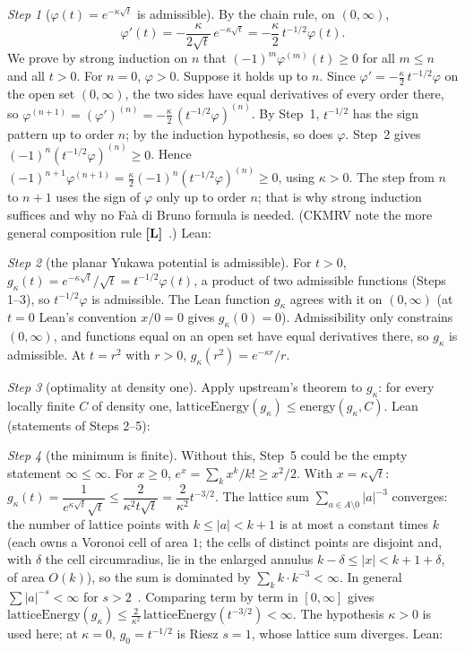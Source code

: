 \documentclass[11pt]{article}
\theoremstyle{remark}
\newtheorem{step}{Step}
\newcommand{\tier}[1]{\textbf{[#1]}}
\begin{document}
\begin{step}[$\varphi(t)=e^{-\kappa\sqrt t}$ is admissible]
By the chain rule, on $(0,\infty)$,
\[\varphi'(t)=-\frac{\kappa}{2\sqrt t}\,e^{-\kappa\sqrt t}=-\frac\kappa2\,t^{-1/2}\varphi(t).\]
We prove by strong induction on $n$ that $(-1)^m\varphi^{(m)}(t)\ge0$ for all $m\le n$ and all $t>0$. For $n=0$,
$\varphi>0$. Suppose it holds up to $n$. Since $\varphi'=-\tfrac\kappa2\,t^{-1/2}\varphi$ on the open set $(0,\infty)$,
the two sides have equal derivatives of every order there, so
$\varphi^{(n+1)}=(\varphi')^{(n)}=-\tfrac\kappa2\,(t^{-1/2}\varphi)^{(n)}$. By Step~1, $t^{-1/2}$ has the sign pattern
up to order $n$; by the induction hypothesis, so does $\varphi$. Step~2 gives $(-1)^n(t^{-1/2}\varphi)^{(n)}\ge0$.
Hence $(-1)^{n+1}\varphi^{(n+1)}=\tfrac\kappa2(-1)^n(t^{-1/2}\varphi)^{(n)}\ge0$, using $\kappa>0$. The step from $n$ to
$n+1$ uses the sign of $\varphi$ only up to order $n$; that is why strong induction suffices and why no Fa\`a di Bruno
formula is needed. (CKMRV note the more general composition rule \tier{L}~\cite{ckmrv}.) Lean:
\end{step}


\begin{step}[the planar Yukawa potential is admissible]
For $t>0$, $g_\kappa(t)=e^{-\kappa\sqrt t}/\sqrt t=t^{-1/2}\varphi(t)$, a product of two admissible functions (Steps
1--3), so $t^{-1/2}\varphi$ is admissible. The Lean function $g_\kappa$ agrees with it on $(0,\infty)$ (at $t=0$ Lean's
convention $x/0=0$ gives $g_\kappa(0)=0$). Admissibility only constrains $(0,\infty)$, and functions equal on an open
set have equal derivatives there, so $g_\kappa$ is admissible. At $t=r^2$ with $r>0$, $g_\kappa(r^2)=e^{-\kappa r}/r$.
\end{step}
\begin{step}[optimality at density one]
Apply upstream's theorem to $g_\kappa$: for every locally finite $C$ of density one,
$\mathrm{latticeEnergy}(g_\kappa)\le\mathrm{energy}(g_\kappa,C)$. Lean (statements of Steps 2--5):
\end{step}


\begin{step}[the minimum is finite]
Without this, Step~5 could be the empty statement $\infty\le\infty$. For $x\ge0$, $e^x=\sum_k x^k/k!\ge x^2/2$. With
$x=\kappa\sqrt t$: $g_\kappa(t)=\dfrac{1}{e^{\kappa\sqrt t}\sqrt t}\le\dfrac{2}{\kappa^2 t\sqrt t}=\dfrac2{\kappa^2}t^{-3/2}$.
The lattice sum $\sum_{a\in A\setminus0}|a|^{-3}$ converges: the number of lattice points with $k\le|a|<k+1$ is at
most a constant times $k$ (each owns a Voronoi cell of area $1$; the cells of distinct points are disjoint and, with
$\delta$ the cell circumradius, lie in the enlarged annulus $k-\delta\le|x|<k+1+\delta$, of area $O(k)$), so the sum is
dominated by
$\sum_k k\cdot k^{-3}<\infty$. In general $\sum|a|^{-s}<\infty$ for $s>2$~\cite{d12}. Comparing term by term in
$[0,\infty]$ gives $\mathrm{latticeEnergy}(g_\kappa)\le\tfrac2{\kappa^2}\,\mathrm{latticeEnergy}(t^{-3/2})<\infty$.
The hypothesis $\kappa>0$ is used here; at $\kappa=0$, $g_0=t^{-1/2}$ is Riesz $s=1$, whose lattice sum diverges. Lean:
\end{step}

\end{document}
